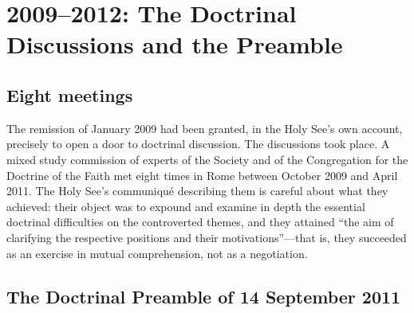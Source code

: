 \section{2009--2012: The Doctrinal Discussions and the Preamble}

\subsection{Eight meetings}

The remission of January 2009 had been granted, in the Holy See's own
account, precisely to open a door to doctrinal discussion. The
discussions took place. A mixed study commission of experts of the
Society and of the Congregation for the Doctrine of the Faith met eight
times in Rome between October 2009 and April 2011. The Holy See's
communiqué describing them is careful about what they achieved: their
object was to expound and examine in depth the essential doctrinal
difficulties on the controverted themes, and they attained ``the aim of
clarifying the respective positions and their motivations''---that is,
they succeeded as an exercise in mutual comprehension, not as a
negotiation.

\subsection{The Doctrinal Preamble of 14 September 2011}

